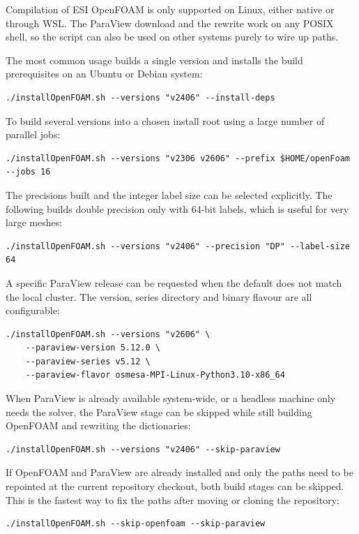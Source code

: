 Compilation of ESI OpenFOAM is only supported on Linux, either native or through WSL. The ParaView download and the  rewrite work on any POSIX shell, so the script can also be used on other systems purely to wire up paths.

The most common usage builds a single version and installs the build prerequisites on an Ubuntu or Debian system:
\begin{lstlisting}
./installOpenFOAM.sh --versions "v2406" --install-deps
\end{lstlisting}

To build several versions into a chosen install root using a large number of parallel jobs:
\begin{lstlisting}
./installOpenFOAM.sh --versions "v2306 v2606" --prefix $HOME/openFoam --jobs 16
\end{lstlisting}

The precisions built and the integer label size can be selected explicitly. The following builds double precision only with 64-bit labels, which is useful for very large meshes:
\begin{lstlisting}
./installOpenFOAM.sh --versions "v2406" --precision "DP" --label-size 64
\end{lstlisting}

A specific ParaView release can be requested when the default does not match the local cluster. The version, series directory and binary flavour are all configurable:
\begin{lstlisting}
./installOpenFOAM.sh --versions "v2606" \
    --paraview-version 5.12.0 \
    --paraview-series v5.12 \
    --paraview-flavor osmesa-MPI-Linux-Python3.10-x86_64
\end{lstlisting}

When ParaView is already available system-wide, or a headless machine only needs the solver, the ParaView stage can be skipped while still building OpenFOAM and rewriting the dictionaries:
\begin{lstlisting}
./installOpenFOAM.sh --versions "v2406" --skip-paraview
\end{lstlisting}

If OpenFOAM and ParaView are already installed and only the  paths need to be repointed at the current repository checkout, both build stages can be skipped. This is the fastest way to fix the paths after moving or cloning the repository:
\begin{lstlisting}
./installOpenFOAM.sh --skip-openfoam --skip-paraview
\end{lstlisting}

